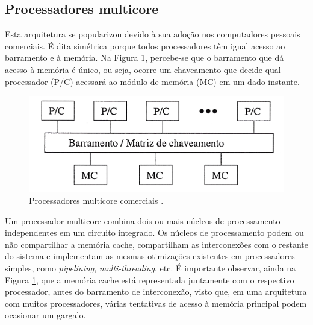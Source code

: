 \documentclass[ccc, pg2]{esinucpel}
\begin{document}

\subsection{Processadores multicore}
Esta arquitetura se popularizou devido à sua adoção nos computadores pessoais comerciais. É dita simétrica porque todos processadores têm igual acesso ao barramento e à memória. Na Figura \ref{fig:smp2}, percebe-se que o barramento que dá acesso à memória é único, ou seja, ocorre um chaveamento que decide qual processador (P/C) acessará ao módulo de memória (MC) em um dado instante.


\begin{figure}[htbp]
\centering
\includegraphics[scale=1.1]{images/smp2.jpg}
\caption{Processadores multicore comerciais \cite{bib:crad}.}
\label{fig:smp2}
\end{figure}

Um processador multicore combina dois ou mais núcleos de processamento independentes em um circuito integrado. Os núcleos de processamento podem ou não compartilhar a memória cache, compartilham as interconexões com o restante do sistema e implementam as mesmas otimizações existentes em processadores simples, como {\it pipelining}, {\it multi-threading}, etc. É importante observar, ainda na Figura \ref{fig:smp2}, que a memória cache está representada juntamente com o respectivo processador, antes do barramento de interconexão, visto que, em uma arquitetura com muitos processadores, várias tentativas de acesso à memória principal podem ocasionar um gargalo.
\end{document}
